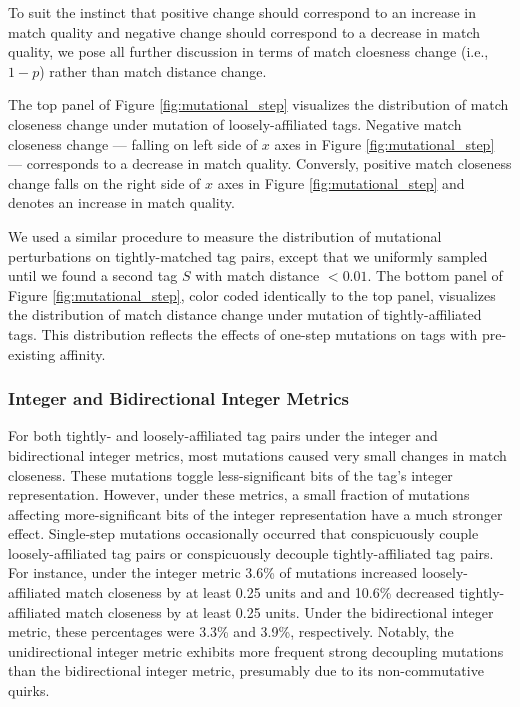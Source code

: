 To suit the instinct that positive change should correspond to an increase in match quality and negative change should correspond to a decrease in match quality, we pose all further discussion in terms of match cloesness change (i.e., $1 - p$) rather than match distance change.

The top panel of Figure \ref{fig:mutational_step} visualizes the distribution of match closeness change under mutation of loosely-affiliated tags.
Negative match closeness change --- falling on left side of $x$ axes in Figure \ref{fig:mutational_step} --- corresponds to a decrease in match quality.
Conversly, positive match closeness change falls on the right side of $x$ axes in Figure \ref{fig:mutational_step} and denotes an increase in match quality.

We used a similar procedure to measure the distribution of mutational perturbations on tightly-matched tag pairs, except that we uniformly sampled until we found a second tag $S$ with match distance $< 0.01$.
The bottom panel of Figure \ref{fig:mutational_step}, color coded identically to the top panel, visualizes the distribution of match distance change under mutation of tightly-affiliated tags.
This distribution reflects the effects of one-step mutations on tags with pre-existing affinity.

\subsubsection{Integer and Bidirectional Integer Metrics}

For both tightly- and loosely-affiliated tag pairs under the integer and bidirectional integer metrics, most mutations caused very small changes in match closeness.
These mutations toggle less-significant bits of the tag's integer representation.
However, under these metrics, a small fraction of mutations affecting more-significant bits of the integer representation have a much stronger effect.
Single-step mutations occasionally occurred that conspicuously couple loosely-affiliated tag pairs or conspicuously decouple tightly-affiliated tag pairs.
For instance, under the integer metric 3.6\% of mutations increased loosely-affiliated match closeness by at least 0.25 units and and 10.6\% decreased tightly-affiliated match closeness by at least 0.25 units.
Under the bidirectional integer metric, these percentages were 3.3\% and 3.9\%, respectively.
Notably, the unidirectional integer metric exhibits more frequent strong decoupling mutations than the bidirectional integer metric, presumably due to its non-commutative quirks.

